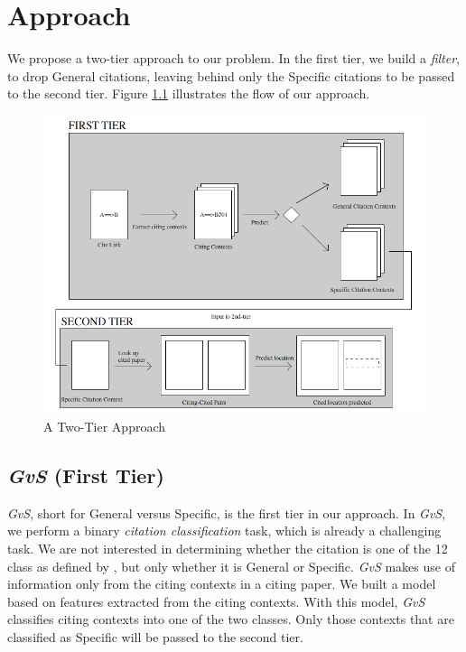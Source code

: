 \chapter{Approach}
\label{approach}
We propose a two-tier approach to our problem. In the first tier, we build a \textit{filter}, to drop General citations, leaving behind only the Specific citations to be passed to the second tier. Figure \ref{fig:twotier} illustrates the flow of our approach.
\begin{figure}[h]
  \centering
  \includegraphics[scale=0.60]{./twotier}
  \caption{A Two-Tier Approach}
  \label{fig:twotier}
\end{figure}

\section{{\it GvS} (First Tier)}
\label{firsttier}
{\it GvS}, short for General versus Specific, is the first tier in our approach. In {\it GvS}, we perform a binary \textit{citation classification} task, which is already a challenging task. 
We are not interested in determining whether the citation is one of the 12 class as defined by \cite{teufel2009annotation}, but only whether it is General or Specific. 
{\it GvS} makes use of information only from the citing contexts in a citing paper. We built a model based on features extracted from the citing contexts. With this model, {\it GvS} classifies citing contexts into one of the two classes. 
Only those contexts that are classified as Specific will be passed to the second tier.

